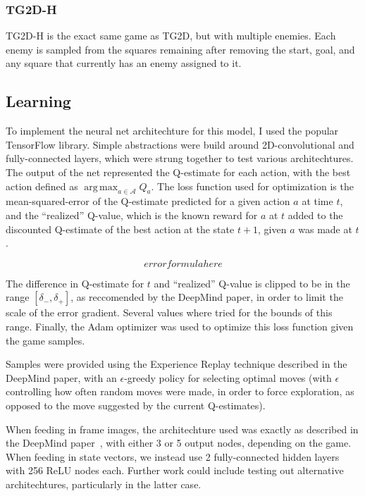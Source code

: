 \documentclass[12pt]{article}
\DeclareMathOperator*{\argmax}{arg\,max}
\begin{document}
\subsubsection{TG2D-H}

TG2D-H is the exact same game as TG2D, but with multiple enemies. Each enemy is sampled from the squares remaining after removing the start, goal, and any square that currently has an enemy assigned to it.

\subsection{Learning}

To implement the neural net architechture for this model, I used the popular TensorFlow library. Simple abstractions were build around 2D-convolutional and fully-connected layers, which were strung together to test various architechtures. The output of the net represented the Q-estimate for each action, with the best action defined as $\argmax_{a \in \mathcal{A}} Q_a$. The loss function used for optimization is the mean-squared-error of the Q-estimate predicted for a given action $a$ at time $t$, and the ``realized'' Q-value, which is the known reward for $a$ at $t$ added to the discounted Q-estimate of the best action at the state $t+1$, given $a$ was made at $t$.

\[error formula here\]

The difference in Q-estimate for $t$ and ``realized'' Q-value is clipped to be in the range $[\delta_{-}, \delta_{+}]$, as reccomended by the DeepMind paper, in order to limit the scale of the error gradient. Several values where tried for the bounds of this range. Finally, the Adam optimizer was used to optimize this loss function given the game samples.

Samples were provided using the Experience Replay technique described in the DeepMind paper, with an $\epsilon$-greedy policy for selecting optimal moves (with $\epsilon$ controlling how often random moves were made, in order to force exploration, as opposed to the move suggested by the current Q-estimates).

When feeding in frame images, the architechture used was exactly as described in the DeepMind paper~\cite{deepmind}, with either 3 or 5 output nodes, depending on the game. When feeding in state vectors, we instead use 2 fully-connected hidden layers with 256 ReLU nodes each. Further work could include testing out alternative architechtures, particularly in the latter case.
\end{document}
